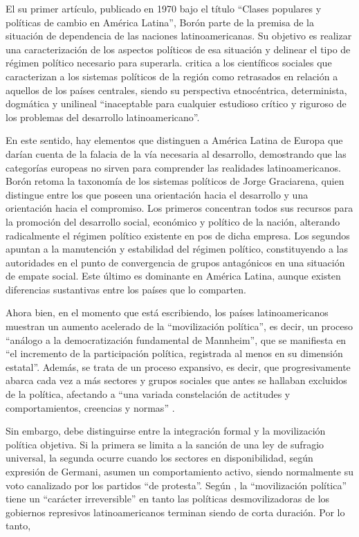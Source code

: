 {El su primer artículo, publicado en 1970 bajo el título \enquote{Clases populares y políticas de cambio en América Latina}, Borón parte de la premisa de la situación de dependencia de las naciones latinoamericanas. Su objetivo es realizar una caracterización de los aspectos políticos de esa situación y delinear el tipo de régimen político necesario para superarla. \textcite[101]{1569-BORON2020} critica a los científicos sociales que caracterizan a los sistemas políticos de la región como retrasados en relación a aquellos de los países centrales, siendo su perspectiva etnocéntrica, determinista, dogmática y unilineal \enquote{inaceptable para cualquier estudioso crítico y riguroso de los problemas del desarrollo latinoamericano}.

En este sentido, hay elementos que distinguen a América Latina de Europa que darían cuenta de la falacia de la vía necesaria al desarrollo, demostrando que las categorías europeas no sirven para comprender las realidades latinoamericanos. Borón retoma la taxonomía de los sistemas políticos de Jorge Graciarena, quien distingue entre los que poseen una orientación hacia el desarrollo y una orientación hacia el compromiso. Los primeros concentran todos sus recursos para la promoción del desarrollo social, económico y político de la nación, alterando radicalmente el régimen político existente en pos de dicha empresa. Los segundos apuntan a la manutención y estabilidad del régimen político, constituyendo a las autoridades en el punto de convergencia de grupos antagónicos en una situación de empate social. Este último es dominante en América Latina, aunque existen diferencias sustantivas entre los países que lo comparten.

Ahora bien, en el momento que \textcite[115]{1569-BORON2020} está escribiendo, los países latinoamericanos muestran un aumento acelerado de la \enquote{movilización política}, es decir, un proceso \enquote{análogo a la democratización fundamental de Mannheim}, que se manifiesta en \enquote{el incremento de la participación política, registrada al menos en su dimensión estatal}. Además, se trata de un proceso expansivo, es decir, que progresivamente abarca cada vez a más sectores y grupos sociales que antes se hallaban excluidos de la política, afectando a \enquote{una variada constelación de actitudes y comportamientos, creencias y normas} \parencite[116]{1569-BORON2020}.

Sin embargo, debe distinguirse entre la integración formal y la movilización política objetiva. Si la primera se limita a la sanción de una ley de sufragio universal, la segunda ocurre cuando los sectores en disponibilidad, según expresión de Germani, asumen un comportamiento activo, siendo normalmente su voto canalizado por los partidos \enquote{de protesta}. Según \textcite[118]{1569-BORON2020}, la \enquote{movilización política} tiene un \enquote{carácter irreversible} en tanto las políticas desmovilizadoras de los gobiernos represivos latinoamericanos terminan siendo de corta duración. Por lo tanto,

}

